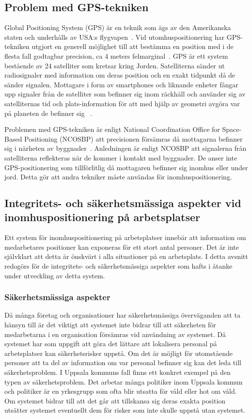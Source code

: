 \documentclass[a4paper,12pt]{article}
\begin{document}
 \subsection{Problem med GPS-tekniken}
 Global Positioning System (GPS) är en teknik som ägs av den Amerikanska staten och underhålls av USA:s flygvapen~\cite{GPS_US_HOW}.
 Vid utomhuspositionering har GPS-tekniken utgjort en generell möjlighet till att bestämma en position med i de flesta fall godtagbar precision, ca 4 meters felmarginal~\cite{GPS_US_ACCURACY}.
 GPS är ett system bestående av 24 satelliter som kretsar kring Jorden. Satelliterna sänder ut radiosignaler med information om deras position och en exakt tidpunkt då de sänder signalen. Mottagare i form av smartphones och liknande enheter fångar upp signaler från de satelliter som befinner sig inom räckhåll och använder sig av satelliternas tid och plats-information för att med hjälp av geometri avgöra var på planeten de befinner sig ~\cite{GPS_US_HOW}.

 Problemen med GPS-tekniken är enligt National Coordination Office for Space-Based Positioning (NCOSBP) att precisionen försämras då mottagarna befinner sig i närheten av byggnader~\cite{GPS_US_ACCURACY}. Anledningen är enligt NCOSBP att signalerna från satelliterna reflekteras när de kommer i kontakt med byggnader. De anser inte GPS-positionering som tillförlitlig då mottagaren befinner sig inomhus eller under jord. Detta gör att andra tekniker måste användas för inomhuspositionering.

 \subsection{Integritets- och säkerhetsmässiga aspekter vid inomhuspositionering på arbetsplatser}\label{icketekniska_aspekter}
 Ett system för inomhuspositionering på arbetsplatser innebär att information om medarbetares positioner kan exponeras för ett stort antal personer. Det är inte självklart att detta är önskvärt i alla situationer på en arbetsplats. I detta avsnitt redogörs för de integritets- och säkerhetsmässiga aspekter som hafts i åtanke under utveckling av detta system.

 \subsubsection{Säkerhetsmässiga aspekter}
 Då många företag och organisationer har säkerhetsmässiga överväganden att ta hänsyn till är det viktigt att systemet inte bidrar till att säkerheten för medarbetarna i en organisation försämras vid användning av systemet.
 Då systemet har som uppgift att göra det lättare att lokalisera personal på arbetsplatser kan säkerhetsrisker uppstå. Om det är möjligt för utomstående personer att ta del av information om var personal befinner sig kan det leda till säkerhetsproblem. I Uppsala kommuns fall finns ett konkret exempel på den typen av säkerhetsproblem. Det arbetar många politiker inom Uppsala kommun och politiker är en yrkesgrupp som ofta blir utsatta för våld eller hot om våld. Om systemet bidrar till att det går att tillskansa sig deras exakta position utsätter systemet eventuellt dem för risker som inte skulle uppstå utan systemet.
\end{document}

